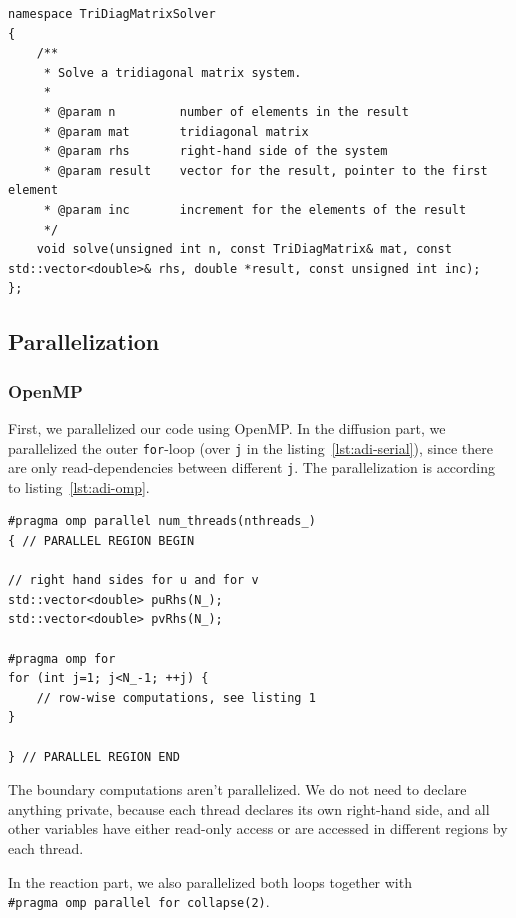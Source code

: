 \documentclass[a4paper]{article}
\begin{document}
\begin{lstlisting}[label={lst:thomas-dec}, caption={Declaration of our implementation of the Thomas algorithm}, float]
namespace TriDiagMatrixSolver
{
    /**
     * Solve a tridiagonal matrix system.
     * 
     * @param n         number of elements in the result
     * @param mat       tridiagonal matrix
     * @param rhs       right-hand side of the system
     * @param result    vector for the result, pointer to the first element
     * @param inc       increment for the elements of the result
     */
    void solve(unsigned int n, const TriDiagMatrix& mat, const std::vector<double>& rhs, double *result, const unsigned int inc);
};
\end{lstlisting}


\subsection{Parallelization}

\subsubsection{OpenMP}
First, we parallelized our code using OpenMP.
In the diffusion part, we parallelized the outer \verb+for+-loop (over \verb+j+ in the listing~\ref{lst:adi-serial}), since there are only read-dependencies between different \verb+j+.
The parallelization is according to listing~\ref{lst:adi-omp}.

\begin{lstlisting}[label={lst:adi-omp}, caption={Parallel OpenMP region}, float]
#pragma omp parallel num_threads(nthreads_)
{ // PARALLEL REGION BEGIN

// right hand sides for u and for v
std::vector<double> puRhs(N_);
std::vector<double> pvRhs(N_);

#pragma omp for
for (int j=1; j<N_-1; ++j) {
    // row-wise computations, see listing 1
}

} // PARALLEL REGION END
\end{lstlisting}
The boundary computations aren't parallelized.
We do not need to declare anything private, because each thread declares its own right-hand side, and all other variables have either read-only access or are accessed in different regions by each thread.

In the reaction part, we also parallelized both loops together with \\
\verb+#pragma omp parallel for collapse(2)+.
\end{document}
